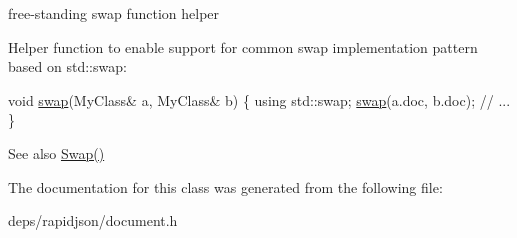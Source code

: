 free-\/standing swap function helper 

Helper function to enable support for common swap implementation pattern based on {\ttfamily std\+::swap\+:} 
\begin{DoxyCode}
\textcolor{keywordtype}{void} \hyperlink{class_generic_document_a0d63efcc43758ac3aed77e868233369d}{swap}(MyClass& a, MyClass& b) \{
    \textcolor{keyword}{using} std::swap;
    \hyperlink{class_generic_document_a0d63efcc43758ac3aed77e868233369d}{swap}(a.doc, b.doc);
    \textcolor{comment}{// ...}
\}
\end{DoxyCode}
 \begin{DoxySeeAlso}{See also}
\hyperlink{class_generic_document_a6290e1290fad74177625af5938c0c58f}{Swap()} 
\end{DoxySeeAlso}


The documentation for this class was generated from the following file\+:\begin{DoxyCompactItemize}
\item 
deps/rapidjson/document.\+h\end{DoxyCompactItemize}
